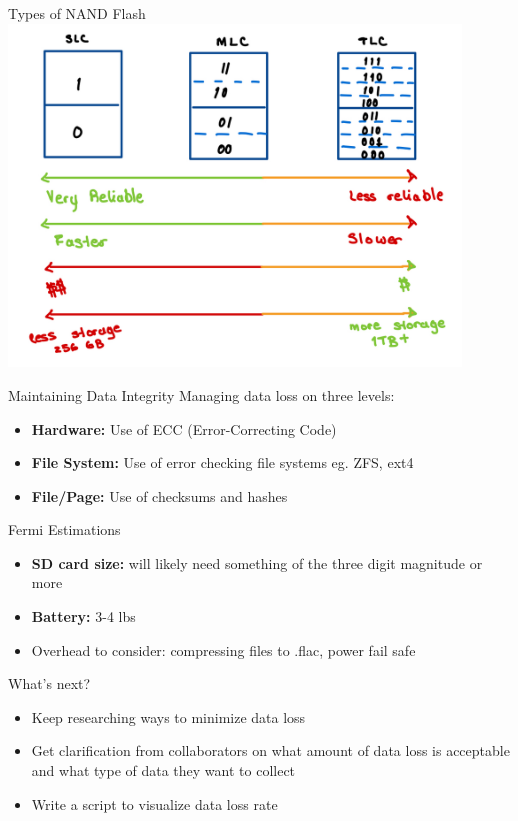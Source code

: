 \begin{frame}{Types of NAND Flash}
    \centering
    \includegraphics[height=0.9\textheight,width=0.9\textwidth,keepaspectratio]{images/flash_types.png}
\end{frame}

\begin{frame}{Maintaining Data Integrity}
    Managing data loss on three levels:
    \begin{itemize}
        \item \textbf{Hardware:} Use of ECC (Error-Correcting Code)
        \item \textbf{File System:} Use of error checking file systems eg. ZFS, ext4
        \item \textbf{File/Page:} Use of checksums and hashes
    \end{itemize}
\end{frame}

\begin{frame}{Fermi Estimations}
    \begin{itemize}
        \item \textbf{SD card size:} will likely need something of the three digit magnitude or more
        \item \textbf{Battery:} 3-4 lbs
        \item Overhead to consider: compressing files to .flac, power fail safe
    \end{itemize}
\end{frame}

\begin{frame}{What's next?}
    \begin{itemize}
        \item Keep researching ways to minimize data loss
        \item Get clarification from collaborators on what amount of data loss is acceptable and what type of data they want to collect
        \item Write a script to visualize data loss rate
    \end{itemize}
\end{frame}
